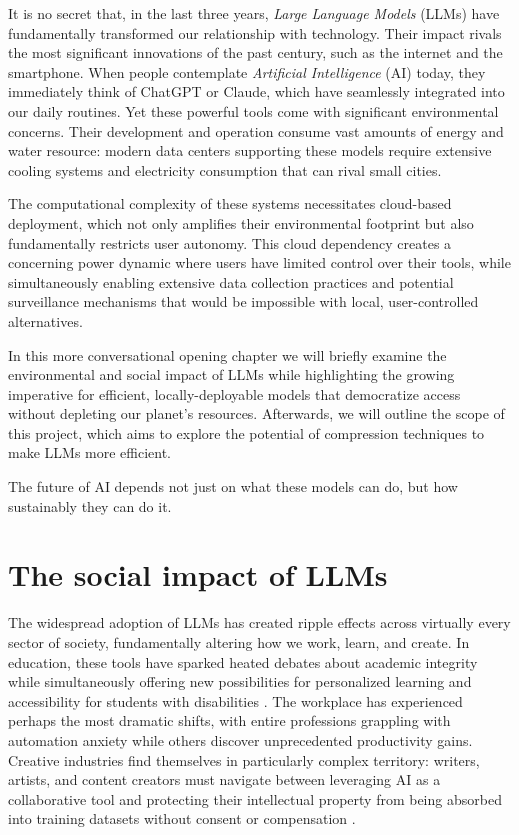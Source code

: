 It is no secret that, in the last three years, \textit{Large Language Models} (LLMs) have fundamentally transformed our relationship with technology.
Their impact rivals the most significant innovations of the past century, such as the internet and the smartphone. When people contemplate \textit{Artificial Intelligence} (AI) today, they immediately think of ChatGPT or Claude, which have seamlessly integrated into our daily routines.
Yet these powerful tools come with significant environmental concerns. Their development and operation consume vast amounts of energy and water resource: modern data centers supporting these models require extensive cooling systems and electricity consumption that can rival small cities.

The computational complexity of these systems necessitates cloud-based deployment, which not only amplifies their environmental footprint but also fundamentally restricts user autonomy. This cloud dependency creates a concerning power dynamic where users have limited control over their tools, while simultaneously enabling extensive data collection practices and potential surveillance mechanisms that would be impossible with local, user-controlled alternatives.

In this more conversational opening chapter we will briefly examine the environmental and social impact of LLMs while highlighting the growing imperative for efficient, locally-deployable models that democratize access without depleting our planet's resources. Afterwards, we will outline the scope of this project, which aims to explore the potential of compression techniques to make LLMs more efficient.

The future of AI depends not just on what these models can do, but how sustainably they can do it.

\section{The social impact of LLMs}
The widespread adoption of LLMs has created ripple effects across virtually every sector of society, fundamentally altering how we work, learn, and create. In education, these tools have sparked heated debates about academic integrity while simultaneously offering new possibilities for personalized learning and accessibility for students with disabilities \cite{academic_integrity}. The workplace has experienced perhaps the most dramatic shifts, with entire professions grappling with automation anxiety while others discover unprecedented productivity gains. Creative industries find themselves in particularly complex territory: writers, artists, and content creators must navigate between leveraging AI as a collaborative tool and protecting their intellectual property from being absorbed into training datasets without consent or compensation \cite{artistic_integrity}.

